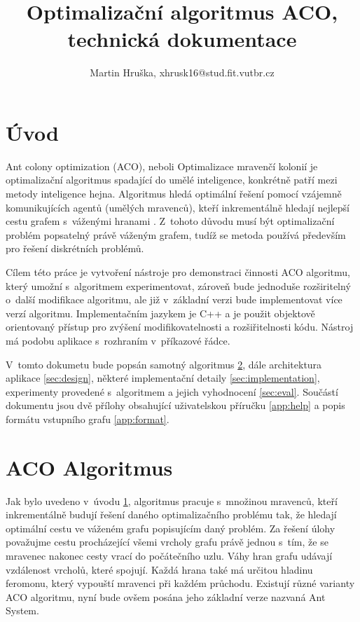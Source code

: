 \documentclass[a4paper, 12pt]{article}
\title{Optimalizační algoritmus ACO, technická dokumentace}
\author{Martin Hruška, xhrusk16@stud.fit.vutbr.cz}
\date{}
\begin{document}
\maketitle

\section{Úvod}
\label{sec:intro}
Ant colony optimization (ACO), neboli Optimalizace mravenčí kolonií je optimalizační algoritmus spadající do umělé inteligence,
konkrétně patří mezi metody inteligence hejna. Algoritmus hledá optimální řešení pomocí vzájemně komunikujících agentů (umělých mravenců), kteří
inkrementálně hledají nejlepší cestu grafem s~váženými hranami \cite{aco:main}. 
Z~tohoto důvodu musí být optimalizační problém popsatelný právě váženým grafem, tudíž se metoda používá především pro řešení diskrétních problémů.

Cílem této práce je vytvoření nástroje pro demonstraci činnosti ACO algoritmu, který umožní s~algoritmem experimentovat, zároveň bude jednoduše rozširitelný
o~další modifikace algoritmu, ale již v~základní verzi bude implementovat více verzí algoritmu. Implementačním jazykem je C++ a je použit objektově orientovaný
přístup pro zvýšení modifikovatelnosti a rozšiřitelnosti kódu. Nástroj má podobu aplikace s~rozhraním v~příkazové řádce.

V~tomto dokumetu bude popsán samotný algoritmus \ref{sec:algorithm}, dále architektura aplikace \ref{sec:design},
některé implementační detaily \ref{sec:implementation}, experimenty provedené s~algoritmem a jejich vyhodnocení \ref{sec:eval}.
Součástí dokumentu jsou dvě přílohy obsahující uživatelskou příručku \ref{app:help} a popis formátu vstupního grafu \ref{app:format}.

\section{ACO Algoritmus}
\label{sec:algorithm}
Jak bylo uvedeno v~úvodu \ref{sec:intro}, algoritmus pracuje s~množinou mravenců, kteří inkrementálně budují řešení daného optimalizačního problému tak, že
hledají optimální cestu ve váženém grafu popisujícím daný problém. Za řešení úlohy považujme cestu procházející všemi vrcholy grafu právě jednou s~tím, že se
mravenec nakonec cesty vrací do počátečního uzlu. Váhy hran grafu udávají vzdálenost vrcholů, které spojují. Každá hrana také má určitou hladinu feromonu, který
vypouští mravenci při každém průchodu. Existují různé varianty ACO algoritmu, nyní bude ovšem posána jeho základní verze nazvaná Ant System.
\end{document}
